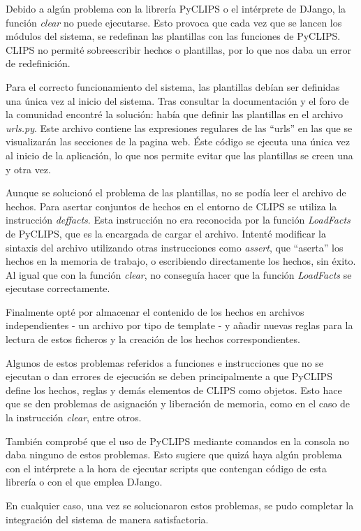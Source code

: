 Debido a algún problema con la librería PyCLIPS o el intérprete de DJango, la función \textit{clear} no puede ejecutarse. Esto provoca que cada vez que se lancen los módulos del sistema, se redefinan las plantillas con las funciones de PyCLIPS. CLIPS no permité sobreescribir hechos o plantillas, por lo que nos daba un error de redefinición. 

Para el correcto funcionamiento del sistema, las plantillas debían ser definidas una única vez al inicio del sistema. Tras consultar la documentación y el foro de la comunidad encontré la solución: había que definir las plantillas en el archivo \textit{urls.py}. Este archivo contiene las expresiones regulares de las ``urls'' en las que se visualizarán las secciones de la pagina web. Éste código se ejecuta una única vez al inicio de la aplicación, lo que nos permite evitar que las plantillas se creen una y otra vez.

Aunque se solucionó el problema de las plantillas, no se podía leer el archivo de hechos. Para asertar conjuntos de hechos en el entorno de CLIPS se utiliza la instrucción \textit{deffacts}. Esta instrucción no era reconocida por la función \textit{LoadFacts} de PyCLIPS, que es la encargada de cargar el archivo. Intenté modificar la sintaxis del archivo utilizando otras instrucciones como \textit{assert}, que ``aserta'' los hechos en la memoria de trabajo, o escribiendo directamente los hechos, sin éxito. Al igual que con la función \textit{clear}, no conseguía hacer que la función \textit{LoadFacts} se ejecutase correctamente. 

Finalmente opté por almacenar el contenido de los hechos en archivos independientes - un archivo por tipo de template - y añadir nuevas reglas para la lectura de estos ficheros y la creación de los hechos correspondientes. 

\bigskip
Algunos de estos problemas referidos a funciones e instrucciones que no se ejecutan o dan errores de ejecución se deben principalmente a que PyCLIPS define los hechos, reglas y demás elementos de CLIPS como objetos. Esto hace que se den problemas de asignación y liberación de memoria, como en el caso de la instrucción \textit{clear}, entre otros. 

También comprobé que el uso de PyCLIPS mediante comandos en la consola no daba ninguno de estos problemas. Esto sugiere que quizá haya algún problema con el intérprete a la hora de ejecutar scripts que contengan código de esta librería o con el que emplea DJango. 

\bigskip
En cualquier caso, una vez se solucionaron estos problemas, se pudo completar la integración del sistema de manera satisfactoria.


